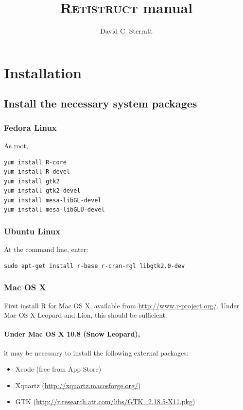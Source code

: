 \documentclass{article}
\title{\textsc{Retistruct} manual}
\author{David C. Sterratt}
\begin{document}
\maketitle
\thispagestyle{myheadings}

\section{Installation}
\label{manual:sec:installation}

\subsection{Install the necessary system packages}

\subsubsection{Fedora Linux }

As root,

\begin{verbatim}
yum install R-core
yum install R-devel
yum install gtk2
yum install gtk2-devel
yum install mesa-libGL-devel
yum install mesa-libGLU-devel
\end{verbatim}

\subsubsection{Ubuntu Linux}
At the command line, enter:

\begin{verbatim}
sudo apt-get install r-base r-cran-rgl libgtk2.0-dev
\end{verbatim}

\subsubsection{Mac OS X}
\label{retistruct-manual:sec:mac}

First install R for Mac OS X, available from
\url{http://www.r-project.org/}. Under Mac OS X Leopard and Lion, this
should be sufficient. 

\paragraph{Under Mac OS X 10.8 (Snow Leopard),} it may be necessary to
install the following external packages:
\begin{itemize}
\item Xcode (free from App Store)
\item Xquartz (\href{http://xquartz.macosforge.org/}{http://xquartz.macosforge.org/})
\item GTK (\href{http://r.research.att.com/libs/GTK_2.18.5-X11.pkg}{http://r.research.att.com/libs/GTK\_2.18.5-X11.pkg})
\end{itemize}
\end{document}
